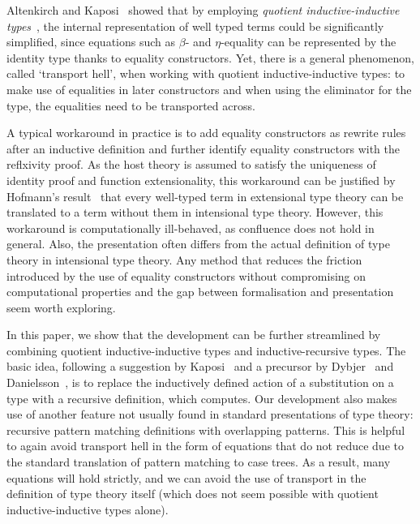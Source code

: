 \documentclass[a4paper,UKenglish,numberwithinsect,cleveref,thm-restate]{lipics-v2021}
\begin{document}
Altenkirch and Kaposi~\cite{Altenkirch2016a} showed that by employing \emph{quotient inductive-inductive types}~\cite{Altenkirch2018}, the internal representation of well typed terms could be significantly simplified, since equations such as $\beta$- and $\eta$-equality can be represented by the identity type thanks to equality constructors.
%
Yet, there is a general phenomenon, called `transport hell', when working with quotient inductive-inductive types: to make use of equalities in later constructors and when using the eliminator for the type, the equalities need to be transported across.
%

A typical workaround in practice \cite{Kaposi2019,Kaposi2024a} is to add equality constructors as rewrite rules after an inductive definition and further identify equality constructors with the reflxivity proof.
%
As the host theory is assumed to satisfy the uniqueness of identity proof and function extensionality, this workaround can be justified by Hofmann's result~\cite{Hofmann1996,Winterhalter2019,Kapulkin2025} that every well-typed term in extensional type theory can be translated to a term without them in intensional type theory.
%
However, this workaround is computationally ill-behaved, as confluence does not hold in general.
Also, the presentation often differs from the actual definition of type theory in intensional type theory.
%
Any method that reduces the friction introduced by the use of equality constructors without compromising on computational properties and the gap between formalisation and presentation seem worth exploring.
%

In this paper, we show that the development can be further streamlined by combining quotient inductive-inductive types and inductive-recursive types.
%
The basic idea, following a suggestion by Kaposi~\cite{Kaposi2023} and a precursor by Dybjer~\cite{Dybjer1996} and Danielsson~\cite{Danielsson2006}, is to replace the inductively defined action of a substitution on a type with a recursive definition, which computes.
%
Our development also makes use of another feature not usually found in standard presentations of type theory: recursive pattern matching definitions with overlapping patterns.
%
This is helpful to again avoid transport hell in the form of equations that do not reduce due to the standard translation of pattern matching to case trees.
%
As a result, many equations will hold strictly, and we can avoid the use of transport in the definition of type theory itself (which does not seem possible with quotient inductive-inductive types alone).
%
\end{document}
